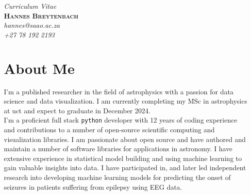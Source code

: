 \documentclass{article}
\newcommand{\tb}{\textbullet}
\newcommand{\uct}{\gls*{uct}\xspace}
\begin{document}
 
\thispagestyle{empty} %

\begin{center}
  \emph{Curriculum Vitae}\\
  \vspace{0.4cm}
  \huge \textbf{\textsc{Hannes Breytenbach}}\\
  \vspace{0.2cm}
  \normalsize
  \emph{\large hannes@saao.ac.za}\\
  \emph{\large +27 78 192 2193 } \\
  \vspace*{\baselineskip}
   \vspace*{-\baselineskip}

  \end{center}

\vspace{-\baselineskip}



\section{About Me}

I'm a published researcher in the field of astrophysics with a passion for data
science and data visualization. I am currently completing my MSc in astrophysics
at \uct and expect to graduate in December 2024.\\
%


I'm a proficient full stack {\tt python} developer with 12 years of coding
experience and contributions to a number of open-source scientific computing and
visualization libraries. I am passionate about open source and have authored and
maintain a number of software libraries for applications in astronomy. I have
extensive experience in statistical model building and using machine learning to
gain valuable insights into data. I have participated in, and later led
independent research into developing machine learning models for predicting the
onset of seizures in patients suffering from epilepsy using EEG data.\\
\end{document}
